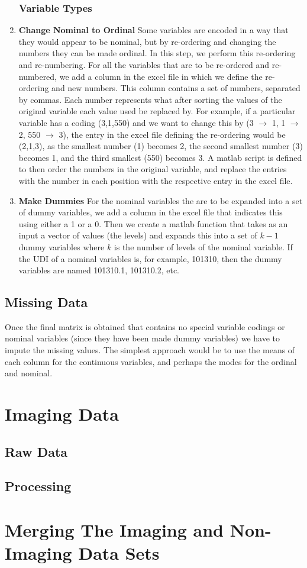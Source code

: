 \documentclass{article}
\begin{document}
\begin{enumerate}
\subsubsection*{Variable Types}
\item {\bf Change Nominal to Ordinal} 
Some variables are encoded in a way that they would appear to be nominal, but by re-ordering and changing the numbers they can be made ordinal. In this step, we perform this re-ordering and re-numbering. For all the variables that are to be re-ordered and re-numbered, we add a column in the excel file in which we define the re-ordering and new numbers. This column contains a set of numbers, separated by commas. Each number represents what after sorting the values of the original variable each value used be replaced by. For example, if a particular variable has a coding (3,1,550) and we want to change this by (3 $\to$ 1, 1 $\to$ 2, 550 $\to$ 3), the entry in the excel file defining the re-ordering would be (2,1,3), as the smallest number (1) becomes 2, the second smallest number (3) becomes 1, and the third smallest (550) becomes 3. A matlab script is defined to then order the numbers in the original variable, and replace the entries with the number in each position with the respective entry in the excel file.
\item {\bf Make Dummies}
For the nominal variables the are to be expanded into a set of dummy variables, we add a column in the excel file that indicates this using either a 1 or a 0. Then we create a matlab function that takes as an input a vector of values (the levels) and expands this into a set of $k-1$ dummy variables where $k$ is the number of levels of the nominal variable. If the UDI of a nominal variables is, for example, 101310, then the dummy variables are named 101310.1, 101310.2, etc. 


\end{enumerate} 


\subsection*{Missing Data}
Once the final matrix is obtained that contains no special variable codings or nominal variables (since they have been made dummy variables) we have to impute the missing values. The simplest approach would be to use the means of each column for the continuous variables, and perhaps the modes for the ordinal and nominal. 



\section{Imaging Data}


\subsection*{Raw Data}

\subsection*{Processing}


\section{Merging The Imaging and Non-Imaging Data Sets}
\end{document}
